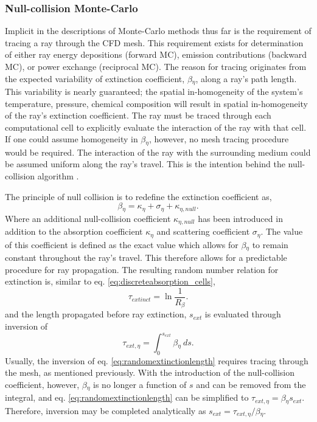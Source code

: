 \subsubsection{Null-collision Monte-Carlo}
Implicit in the descriptions of Monte-Carlo methods thus far is the requirement of tracing a ray through the CFD mesh.
This requirement exists for determination of either ray energy depositions (forward MC), emission contributions (backward MC), or power exchange (reciprocal MC). 
The reason for tracing originates from the expected variability of extinction coefficient, $\beta{}_\eta{}$, along a ray's path length. 
This variability is nearly guaranteed; the spatial in-homogeneity of the system's temperature, pressure, chemical composition will result in spatial in-homogeneity of the ray's extinction coefficient. 
The ray must be traced through each computational cell to explicitly evaluate the interaction of the ray with that cell.
If one could assume homogeneity in $\beta{}_\eta{}$, however, no mesh tracing procedure would be required. The interaction of the ray with the surrounding medium could be assumed uniform along the ray's travel.
This is the intention behind the null-collision algorithm \cite{Galtier2013IntegralAlgorithms,Eymet2013Null-collisionSimulators}.

The principle of null collision is to redefine the extinction coefficient as,
\begin{equation}
    \beta{}_\eta{} = \kappa{}_\eta{}+\sigma{}_\eta+\kappa{}_{\eta{},null}.
    \label{eq:null_coll_absco}
\end{equation}
Where an additional null-collision coefficient $\kappa{}_{\eta,null}$ has been introduced in addition to the absorption coefficient $\kappa{}_\eta$ and scattering coefficient $\sigma{}_\eta{}$. 
The value of this coefficient is defined as the exact value which allows for $\beta{}_\eta{}$ to remain constant throughout the ray's travel.
This therefore allows for a predictable procedure for ray propagation. The resulting random number relation for extinction is, similar to eq. \ref{eq:discreteabsorption_cells},
\begin{equation}
    \tau_{extinct} = \ln{\frac{1}{R_\beta{}}}.
    \label{eq:discreteabsorption_cells_repeated}
\end{equation}
and the length propagated before ray extinction, $s_{ext}$ is evaluated through inversion of
\begin{equation}
    \tau_{ext,\eta{}} = \int_0^{s_{ext}}{\beta{}_\eta{}~ds}.
    \label{eq:randomextinctionlength}
\end{equation}
Usually, the inversion of eq. \ref{eq:randomextinctionlength} requires tracing through the mesh, as mentioned previously. With the introduction of the null-collision coefficient, however, $\beta{}_\eta{}$ is no longer a function of $s$ and can be removed from the integral, and eq. \ref{eq:randomextinctionlength} can be simplified to $\tau{}_{ext,\eta}=\beta{}_\eta{}s_{ext}$. Therefore, inversion may be completed analytically as $s_{ext}=\tau{}_{ext,\eta}/\beta{}_\eta{}$.

